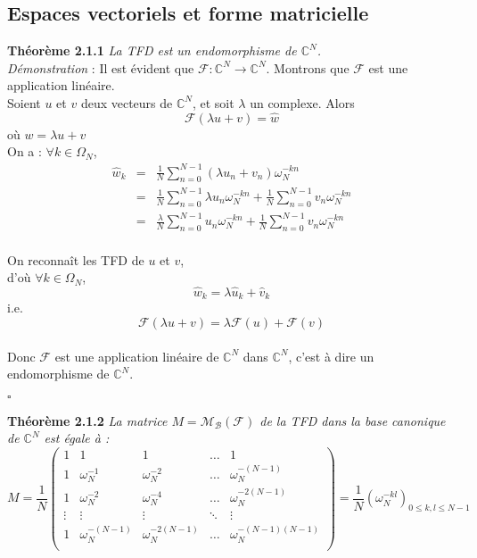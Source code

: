 \documentclass[12pt]{article}
\begin{document}
\subsection{Espaces vectoriels et forme matricielle}
\textbf{Théorème 2.1.1} 
\textit{La TFD est un endomorphisme de \(\mathbb{C}^N\).}\\
\textit{Démonstration} : Il est évident que \(\mathcal{F}:\mathbb{C}^N\rightarrow\mathbb{C}^N\).
Montrons que \(\mathcal{F}\) est une application linéaire.\\
Soient $u$ et $v$ deux vecteurs de $\mathbb{C}^N$, et soit $\lambda$ un complexe.
Alors 
\begin{equation*}
\mathcal{F}(\lambda u+v)=\hat{w}
\end{equation*}
où $w=\lambda u+v$\\
On a : $\forall k\in\Omega_N$, 
\begin{eqnarray*}
\hat{w}_k&=&\frac{1}{N}\sum_{n=0}^{N-1}(\lambda u_n+v_n)\omega_N^{-kn}\\
&=&\frac{1}{N}\sum_{n=0}^{N-1}\lambda u_n \omega_N^{-kn}+\frac{1}{N}\sum_{n=0}^{N-1}v_n\omega_N^{-kn}\\
&=&\frac{\lambda}{N}\sum_{n=0}^{N-1}u_n\omega_N^{-kn}+\frac{1}{N}\sum_{n=0}^{N-1}v_n\omega_N^{-kn}
\end{eqnarray*}\\
On reconnaît les TFD de $u$ et $v$,\\
d'où $\forall k\in\Omega_N$,
\begin{equation*}
\hat{w}_k=\lambda \hat{u}_k + \hat{v}_k
\end{equation*}
i.e.
\begin{equation*}
\mathcal{F}(\lambda u+v)=\lambda\mathcal{F}(u)+\mathcal{F}(v)
\end{equation*}\\
Donc \(\mathcal{F}\) est une application linéaire de $\mathbb{C}^N$ dans $\mathbb{C}^N$, c'est à dire un endomorphisme de $\mathbb{C}^N$.
\begin{flushright} $\square$ \end{flushright}
\textbf{Théorème 2.1.2} \textit{La matrice $M=\mathcal{M_B}(\mathcal{F})$ de la TFD dans la base canonique de $\mathbb{C}^N$ est égale à :}
\begin{equation}
M=\frac{1}{N}
\begin{pmatrix}
1&1&1&\ldots&1\\
1&\omega_N^{-1}&\omega_N^{-2}&\ldots&\omega_N^{-(N-1)}\\
1&\omega_N^{-2}&\omega_N^{-4}&\ldots&\omega_N^{-2(N-1)}\\
\vdots&\vdots&\vdots&\ddots&\vdots\\
1&\omega_N^{-(N-1)}&\omega_N^{-2(N-1)}&\ldots&\omega_N^{-(N-1)(N-1)}\\
\end{pmatrix}
=\frac{1}{N}(\omega_N^{-kl})_{0\leq k,l\leq N-1}
\end{equation}
\end{document}

